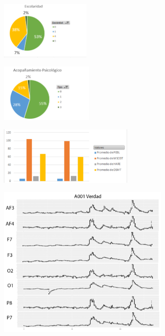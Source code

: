 \begin{center}
\includegraphics[height=1.15in]{figuras/Imagen17.png}
\end{center}

\begin{center}
\includegraphics[height=1.15in]{figuras/Imagen18.png}
\end{center}

\begin{center}
\includegraphics[height=1.15in]{figuras/Imagen19.png}
\end{center}

\begin{center}
\includegraphics[height=3.0in]{figuras/Imagen5.png}
\end{center}

